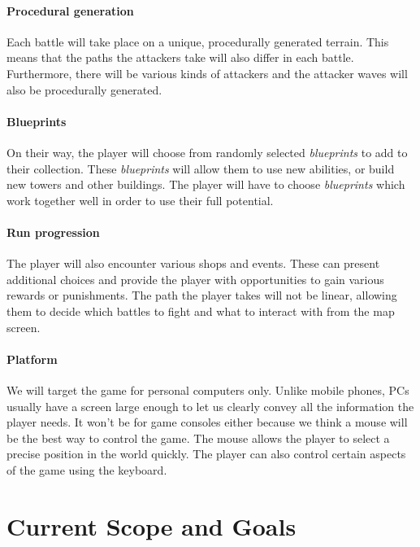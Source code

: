 \paragraph*{Procedural generation}\label{ov-par:procedural-generation}\hfill\break
Each battle will take place on a unique, procedurally generated terrain.
This means that the paths the attackers take will also differ in each battle.
Furthermore, there will be various kinds of attackers and the attacker waves will also be procedurally generated.

\paragraph*{Blueprints}\label{ov-par:blueprints}\hfill\break
On their way, the player will choose from randomly selected \emph{blueprints} to add to their collection.
These \emph{blueprints} will allow them to use new abilities, or build new towers and other buildings.
The player will have to choose \emph{blueprints} which work together well in order to use their full potential.

\paragraph*{Run progression}\label{ov-par:run-progression}\hfill\break
The player will also encounter various shops and events.
These can present additional choices and provide the player with opportunities to gain various rewards or punishments.
The path the player takes will not be linear, allowing them to decide which battles to fight and what to interact with from the map screen.

\paragraph*{Platform}\label{ov-par:platform}\hfill\break
We will target the game for personal computers only.
Unlike mobile phones, PCs usually have a screen large enough to let us clearly convey all the information the player needs.
It won't be for game consoles either because we think a mouse will be the best way to control the game.
The mouse allows the player to select a precise position in the world quickly.
The player can also control certain aspects of the game using the keyboard.

\section{Current Scope and Goals}

